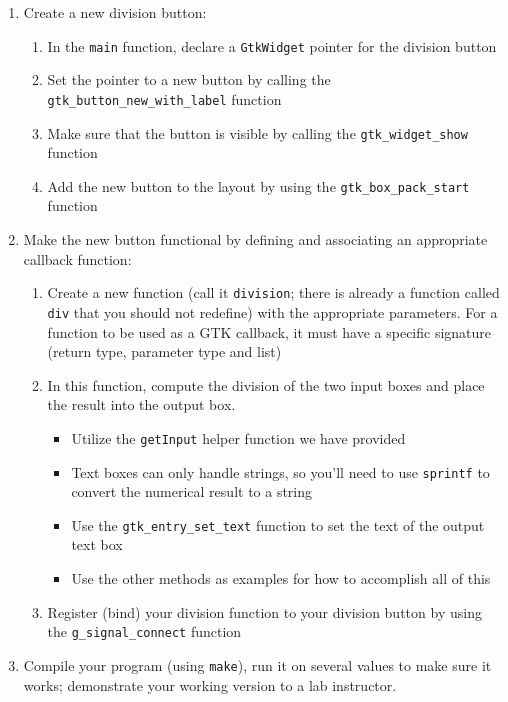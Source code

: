 \documentclass[12pt]{scrartcl}
\begin{document}
\begin{enumerate}
  \item Create a new division button:
  \begin{enumerate}  
    \item In the \texttt{main} function, declare a \texttt{GtkWidget} pointer 
	for the division button
    \item Set the pointer to a new button by calling the \texttt{gtk_button_new_with_label} function
    \item Make sure that the button is visible by calling the \texttt{gtk_widget_show} function 
    \item Add the new button to the layout by using the \texttt{gtk_box_pack_start} function
  \end{enumerate}
  \item Make the new button functional by defining and associating an 
  	appropriate callback function:
  \begin{enumerate}
    \item Create a new function (call it \texttt{division}; there is 
    	already a function called \texttt{div} that you should not 
	redefine) with the appropriate parameters.  For a function to be 
	used as a GTK callback, it must have a specific signature (return 
	type, parameter type and list)
    \item In this function, compute the division of the two input boxes and 
    	place the result into the output box.
    \begin{itemize}
      \item Utilize the \texttt{getInput} helper function we have provided
      \item Text boxes can only handle strings, so you'll need to use \texttt{sprintf} to convert the numerical result to a string
      \item Use the \texttt{gtk_entry_set_text} function to set the text of the output text box
      \item Use the other methods as examples for how to accomplish all of this
    \end{itemize}
    \item Register (bind) your division function to your division button by using the \texttt{g_signal_connect} function
  \end{enumerate}
  \item Compile your program (using \texttt{make}), run it on several 
  	values to make sure it works; demonstrate your working version to a lab instructor.
\end{enumerate}
\end{document}
